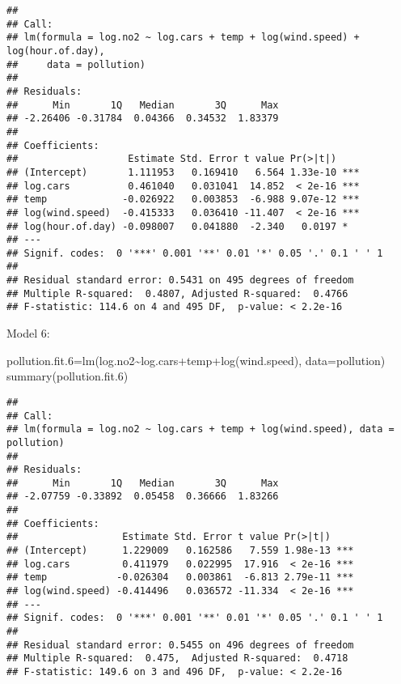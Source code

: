 \documentclass[
]{article}
\newenvironment{Shaded}{\begin{snugshade}}{\end{snugshade}}
\newcommand{\AttributeTok}[1]{\textcolor[rgb]{0.77,0.63,0.00}{#1}}
\newcommand{\FloatTok}[1]{\textcolor[rgb]{0.00,0.00,0.81}{#1}}
\newcommand{\FunctionTok}[1]{\textcolor[rgb]{0.00,0.00,0.00}{#1}}
\newcommand{\NormalTok}[1]{#1}
\newcommand{\OtherTok}[1]{\textcolor[rgb]{0.56,0.35,0.01}{#1}}
\newcommand{\SpecialCharTok}[1]{\textcolor[rgb]{0.00,0.00,0.00}{#1}}
\begin{document}
\begin{verbatim}
## 
## Call:
## lm(formula = log.no2 ~ log.cars + temp + log(wind.speed) + log(hour.of.day), 
##     data = pollution)
## 
## Residuals:
##      Min       1Q   Median       3Q      Max 
## -2.26406 -0.31784  0.04366  0.34532  1.83379 
## 
## Coefficients:
##                   Estimate Std. Error t value Pr(>|t|)    
## (Intercept)       1.111953   0.169410   6.564 1.33e-10 ***
## log.cars          0.461040   0.031041  14.852  < 2e-16 ***
## temp             -0.026922   0.003853  -6.988 9.07e-12 ***
## log(wind.speed)  -0.415333   0.036410 -11.407  < 2e-16 ***
## log(hour.of.day) -0.098007   0.041880  -2.340   0.0197 *  
## ---
## Signif. codes:  0 '***' 0.001 '**' 0.01 '*' 0.05 '.' 0.1 ' ' 1
## 
## Residual standard error: 0.5431 on 495 degrees of freedom
## Multiple R-squared:  0.4807, Adjusted R-squared:  0.4766 
## F-statistic: 114.6 on 4 and 495 DF,  p-value: < 2.2e-16
\end{verbatim}

Model 6:

\begin{Shaded}
\begin{Highlighting}[]
\NormalTok{pollution.fit}\FloatTok{.6}\OtherTok{=}\FunctionTok{lm}\NormalTok{(log.no2}\SpecialCharTok{\textasciitilde{}}\NormalTok{log.cars}\SpecialCharTok{+}\NormalTok{temp}\SpecialCharTok{+}\FunctionTok{log}\NormalTok{(wind.speed), }\AttributeTok{data=}\NormalTok{pollution)}
\FunctionTok{summary}\NormalTok{(pollution.fit}\FloatTok{.6}\NormalTok{)}
\end{Highlighting}
\end{Shaded}

\begin{verbatim}
## 
## Call:
## lm(formula = log.no2 ~ log.cars + temp + log(wind.speed), data = pollution)
## 
## Residuals:
##      Min       1Q   Median       3Q      Max 
## -2.07759 -0.33892  0.05458  0.36666  1.83266 
## 
## Coefficients:
##                  Estimate Std. Error t value Pr(>|t|)    
## (Intercept)      1.229009   0.162586   7.559 1.98e-13 ***
## log.cars         0.411979   0.022995  17.916  < 2e-16 ***
## temp            -0.026304   0.003861  -6.813 2.79e-11 ***
## log(wind.speed) -0.414496   0.036572 -11.334  < 2e-16 ***
## ---
## Signif. codes:  0 '***' 0.001 '**' 0.01 '*' 0.05 '.' 0.1 ' ' 1
## 
## Residual standard error: 0.5455 on 496 degrees of freedom
## Multiple R-squared:  0.475,  Adjusted R-squared:  0.4718 
## F-statistic: 149.6 on 3 and 496 DF,  p-value: < 2.2e-16
\end{verbatim}
\end{document}
